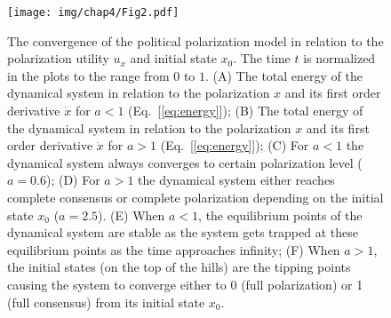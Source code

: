 \begin{figure}
    \centering
    \texttt{[image: img/chap4/Fig2.pdf]}
    \caption{The convergence of the political polarization model in relation to the polarization utility $u_x$ and initial state $x_0$. The time $t$ is normalized in the plots to the range from $0$ to $1$. (A) The total energy of the dynamical system in relation to the polarization $x$ and its first order derivative $\dot{x}$ for $a<1$ (Eq.~[\ref{eq:energy}]); (B) The total energy of the dynamical system in relation to the polarization $x$ and its first order derivative $\dot{x}$ for $a>1$ (Eq.~[\ref{eq:energy}]); (C) For $a<1$ the dynamical system always converges to certain polarization level ($a=0.6$); (D) For $a>1$ the dynamical system either reaches complete consensus or complete polarization depending on the initial state $x_0$ ($a=2.5$). (E) When $a < 1$, the equilibrium points of the dynamical system are stable as the system gets trapped at these equilibrium points as the time approaches infinity; (F) When $a > 1$, the initial states (on the top of the hills) are the tipping points causing the system to converge either to 0 (full polarization) or 1 (full consensus) from its initial state $x_0$.}
    \label{fig:fig2}
\end{figure}

